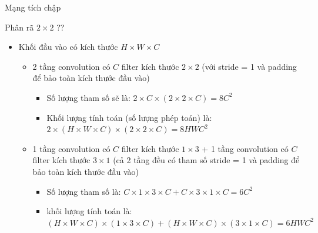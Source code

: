 \documentclass[compress]{beamer}
\begin{document}
\begin{frame}{Mạng tích chập}
\begin{frame}{Phân rã $2\times 2$ ??} 
\begin{itemize}
\item Khối đầu vào có kích thước $H \times W \times C$ 
\begin{itemize}
\item 2 tầng convolution có $C$ filter kích thước $2 \times 2$ (với stride = 1 và padding để bảo toàn kích thước đầu vào) 
\begin{itemize}
\item Số lượng tham số sẽ là: $2 \times C \times (2 \times 2 \times C) = 8C^2$ 
\item Khối lượng tính toán (số lượng phép toán) là: $2 \times (H \times W \times C) \times (2 \times 2 \times C) = 8HWC^2$
\end{itemize}
\item 1 tầng convolution có $C$ filter kích thước $1 \times 3 $ + 1 tầng convolution có $C$ filter kích thước $3 \times 1$ (cả 2 tầng đều có tham số stride = 1 và padding để bảo toàn kích thước đầu vào)
\begin{itemize}
\item Số lượng tham số là: $C \times 1 \times 3 \times C+ C \times 3 \times 1 \times C = 6C^2$ 
\item khối lượng tính toán là: $(H \times W \times C) \times (1 \times 3 \times C) + (H \times W \times C) \times (3 \times 1 \times C) = 6HWC^2$
\end{itemize}
\end{itemize}
\end{itemize}
\end{frame}


\end{frame}
\end{document}
